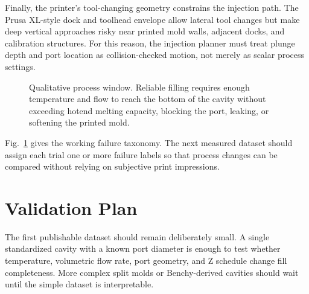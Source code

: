 \documentclass[conference]{IEEEtran}
\begin{document}
Finally, the printer's tool-changing geometry constrains the injection path. The Prusa XL-style dock and toolhead envelope allow lateral tool changes but make deep vertical approaches risky near printed mold walls, adjacent docks, and calibration structures. For this reason, the injection planner must treat plunge depth and port location as collision-checked motion, not merely as scalar process settings.

\begin{figure}[t]
\centering
{}
\caption{Qualitative process window. Reliable filling requires enough temperature and flow to reach the bottom of the cavity without exceeding hotend melting capacity, blocking the port, leaking, or softening the printed mold.}
\label{fig:window}
\end{figure}

Fig.~\ref{fig:window} gives the working failure taxonomy. The next measured dataset should assign each trial one or more failure labels so that process changes can be compared without relying on subjective print impressions.

\section{Validation Plan}
The first publishable dataset should remain deliberately small. A single standardized cavity with a known port diameter is enough to test whether temperature, volumetric flow rate, port geometry, and Z schedule change fill completeness. More complex split molds or Benchy-derived cavities should wait until the simple dataset is interpretable.
\end{document}
